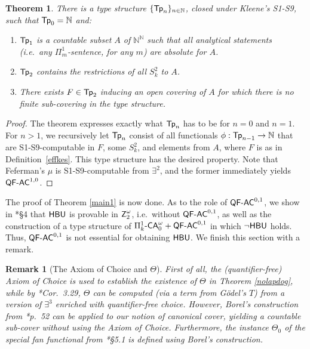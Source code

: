 \documentclass[reqno]{amsart}
\newcommand{\Z}{{\textsf{\textup{Z}}}}
\newtheorem{rem}[thm]{Remark}
\newtheorem{theorem}[thm]{Theorem}
\def\SIXK{\Pi_{k}^{1}\text{-\textsf{\textup{CA}}}_{0}^{\omega}}
\def\({\textup{(}}
\def\){\textup{)}}
\def\N{{\mathbb  N}}
\def\QFAC{\textup{\textsf{QF-AC}}}
\def\HBU{\textup{\textsf{HBU}}}
\numberwithin{equation}{section}
\numberwithin{thm}{section}
\begin{document}
\begin{theorem}\label{6.3}
There is a type structure $\{{\rm \textsf{\textup{Tp}}}_n\}_{n \in \N}$, closed under Kleene's \textup{S1-S9}, such that ${\rm \textsf{\textup{Tp}}}_0 = \N$ and:
\begin{enumerate}
\item ${\rm \textsf{\textup{Tp}}}_1$ is a countable subset $A$ of $\N^\N$ such that all analytical statements \(i.e.\ any $\Pi^1_m$-sentence, for any $m$\) are absolute for $A$.
\item ${\rm \textsf{\textup{Tp}}}_2$ contains the restrictions of all $S^2_k$ to $A$.
\item There exists $F \in {\rm \textsf{\textup{Tp}}}_2$ inducing an open covering of $A$ for which there is no finite sub-covering in the type structure.
\end{enumerate}
\end{theorem}
%
\begin{proof}
The theorem expresses exactly what ${\rm \textsf{\textup{Tp}}}_n$ has to be for $n = 0$ and $n = 1$. For $n > 1$, we recursively let ${\rm \textsf{\textup{Tp}}}_n$ consist of all functionals $\phi:{\rm \textsf{\textup{Tp}}}_{n-1} \rightarrow \N$ that are S1-S9-computable in $F$, some $S^2_k$, and elements from $A$, where $F$ is as in Definition~\ref{effkes}. This type structure has the desired property.
Note that Feferman's $\mu$ is S1-S9-computable from $\exists^{2}$, and the former immediately yields $\QFAC^{1,0}$.  
\end{proof}
The proof of Theorem \ref{main1} is now done.  
As to the role of $\QFAC^{0,1}$, we show in \cite{dagsamV}*{\S4} that $\HBU$ is provable in $\Z_{2}^{\omega}$, i.e.\ without $\QFAC^{0,1}$, as well as the construction of a type structure of $\SIXK+\QFAC^{0,1}$ in which $\neg\HBU$ holds. 
Thus, $\QFAC^{0,1}$ is not essential for obtaining $\HBU$.      
We finish this section with a remark. 
\begin{rem}[The Axiom of Choice and $\Theta$]\label{ThetaK}\rm
First of all, the (quantifier-free) Axiom of Choice is used to establish the existence of $\Theta$ in Theorem \ref{nolapdog}, while by \cite{samFLO}*{Cor.~3.29}, $\Theta$ can be \emph{computed} (via a term from G\"odel's $T$) from a version of $\exists^{3}$ enriched with quantifier-free choice.  However, Borel's construction from \cite{opborrelen}*{p.~52} can be applied to our notion of canonical cover, yielding a \emph{countable sub-cover} {without} using the Axiom of Choice.
Furthermore, the instance $\Theta_{0}$ of the special fan functional from \cite{dagsam}*{\S5.1} is defined using Borel's construction.  
\end{rem}
\end{document}
